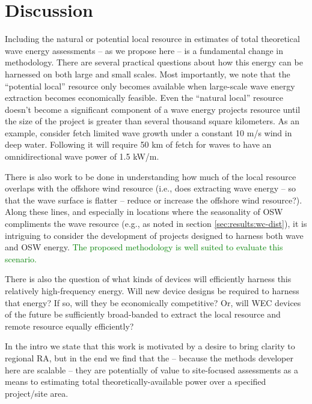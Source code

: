 \section{Discussion} \label{sec:discussion}

Including the natural or potential local resource in estimates of total theoretical wave energy assessments -- as we propose here -- is a fundamental change in methodology. There are several practical questions about how this energy can be harnessed on both large and small scales. 
Most importantly, we note that the ``potential local'' resource only becomes available when large-scale wave energy extraction becomes economically feasible. Even the ``natural local'' resource doesn't become a significant component of a wave energy projects resource until the size of the project is greater than several thousand square kilometers. As an example, consider fetch limited wave growth under a constant 10 m/s wind in deep water. Following \citet{donelan1980similarity} it will require 50 km of fetch for waves to have an omnidirectional wave power of 1.5 kW/m. 

There is also work to be done in understanding how much of the local resource overlaps with the offshore wind resource (i.e., does extracting wave energy -- so that the wave surface is flatter -- reduce or increase the offshore wind resource?). Along these lines, and especially in locations where the seasonality of OSW compliments the wave resource (e.g., as noted in section \ref{sec:results:wc-dist}), it is intriguing to consider the development of projects designed to harness both wave and OSW energy. \textcolor{green}{The proposed methodology is well suited to evaluate this scenario.}

There is also the question of what kinds of devices will efficiently harness this relatively high-frequency energy. Will new device designs be required to harness that energy? If so, will they be economically competitive? Or, will WEC devices of the future be sufficiently broad-banded to extract the local resource and remote resource equally efficiently? 

In the intro we state that this work is motivated by a desire to bring clarity to regional RA, but in the end we find that the -- because the methods developer here are scalable -- they are potentially of value to site-focused assessments as a means to estimating total theoretically-available power over a specified project/site area.


